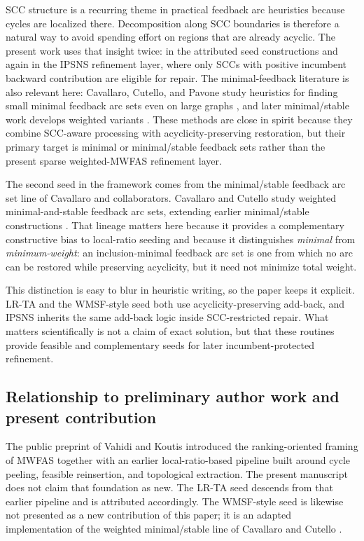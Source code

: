 SCC structure is a recurring theme in practical feedback arc heuristics because cycles are localized there. Decomposition along SCC boundaries is therefore a natural way to avoid spending effort on regions that are already acyclic. The present work uses that insight twice: in the attributed seed constructions and again in the IPSNS refinement layer, where only SCCs with positive incumbent backward contribution are eligible for repair. The minimal-feedback literature is also relevant here: Cavallaro, Cutello, and Pavone study heuristics for finding small minimal feedback arc sets even on large graphs \cite{CCP23CEUR}, and later minimal/stable work develops weighted variants \cite{CCP24,CC25}. These methods are close in spirit because they combine SCC-aware processing with acyclicity-preserving restoration, but their primary target is minimal or minimal/stable feedback sets rather than the present sparse weighted-MWFAS refinement layer.

The second seed in the framework comes from the minimal/stable feedback arc set line of Cavallaro and collaborators. Cavallaro and Cutello \cite{CC25} study weighted minimal-and-stable feedback arc sets, extending earlier minimal/stable constructions \cite{CCP24}. That lineage matters here because it provides a complementary constructive bias to local-ratio seeding and because it distinguishes \emph{minimal} from \emph{minimum-weight}: an inclusion-minimal feedback arc set is one from which no arc can be restored while preserving acyclicity, but it need not minimize total weight.

This distinction is easy to blur in heuristic writing, so the paper keeps it explicit. LR-TA and the WMSF-style seed both use acyclicity-preserving add-back, and IPSNS inherits the same add-back logic inside SCC-restricted repair. What matters scientifically is not a claim of exact solution, but that these routines provide feasible and complementary seeds for later incumbent-protected refinement.

\subsection{Relationship to preliminary author work and present contribution}
\label{subsec:prior-work}

The public preprint of Vahidi and Koutis \cite{VahidiKoutis2024arxiv} introduced the ranking-oriented framing of MWFAS together with an earlier local-ratio-based pipeline built around cycle peeling, feasible reinsertion, and topological extraction. The present manuscript does not claim that foundation as new. The LR-TA seed descends from that earlier pipeline and is attributed accordingly. The WMSF-style seed is likewise not presented as a new contribution of this paper; it is an adapted implementation of the weighted minimal/stable line of Cavallaro and Cutello \cite{CC25}.

